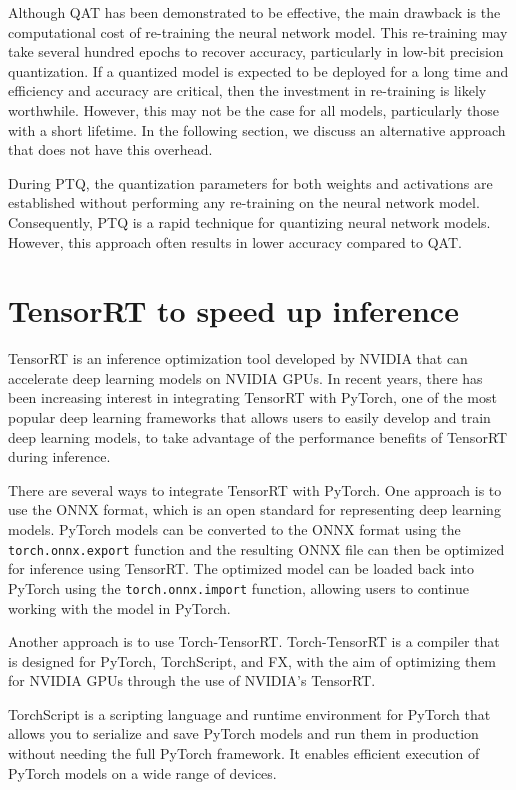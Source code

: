Although QAT has been demonstrated to be effective, the main drawback is the computational cost of re-training the neural network model. This re-training may take several hundred epochs to recover accuracy, particularly in low-bit precision quantization. If a quantized model is expected to be deployed for a long time and efficiency and accuracy are critical, then the investment in re-training is likely worthwhile. However, this may not be the case for all models, particularly those with a short lifetime. In the following section, we discuss an alternative approach that does not have this overhead.

During PTQ, the quantization parameters for both weights and activations are established without performing any re-training on the neural network model. Consequently, PTQ is a rapid technique for quantizing neural network models. However, this approach often results in lower accuracy compared to QAT.

\section{TensorRT to speed up inference}
\label{sec:tensorrt}

TensorRT is an inference optimization tool developed by NVIDIA that can accelerate deep learning models on NVIDIA GPUs. In recent years, there has been increasing interest in integrating TensorRT with PyTorch, one of the most popular deep learning frameworks that allows users to easily develop and train deep learning models, to take advantage of the performance benefits of TensorRT during inference.
 
There are several ways to integrate TensorRT with PyTorch. One approach is to use the ONNX format, which is an open standard for representing deep learning models. PyTorch models can be converted to the ONNX format using the \texttt{torch.onnx.export} function and the resulting ONNX file can then be optimized for inference using TensorRT. The optimized model can be loaded back into PyTorch using the \texttt{torch.onnx.import} function, allowing users to continue working with the model in PyTorch.

Another approach is to use Torch-TensorRT. Torch-TensorRT is a compiler that is designed for PyTorch, TorchScript, and FX, with the aim of optimizing them for NVIDIA GPUs through the use of NVIDIA's TensorRT.

TorchScript is a scripting language and runtime environment for PyTorch that allows you to serialize and save PyTorch models and run them in production without needing the full PyTorch framework. It enables efficient execution of PyTorch models on a wide range of devices.

